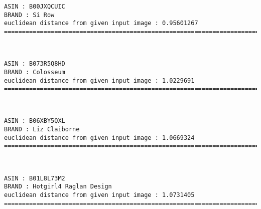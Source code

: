 \documentclass[11pt]{article}
\begin{document}
    \begin{Verbatim}[commandchars=\\\{\}]
ASIN : B00JXQCUIC
BRAND : Si Row
euclidean distance from given input image : 0.95601267
=============================================================================================================================

    \end{Verbatim}

    \begin{center}
    \end{center}
    { \hspace*{\fill} \\}
    
    \begin{Verbatim}[commandchars=\\\{\}]
ASIN : B073R5Q8HD
BRAND : Colosseum
euclidean distance from given input image : 1.0229691
=============================================================================================================================

    \end{Verbatim}

    \begin{center}
    \end{center}
    { \hspace*{\fill} \\}
    
    \begin{Verbatim}[commandchars=\\\{\}]
ASIN : B06XBY5QXL
BRAND : Liz Claiborne
euclidean distance from given input image : 1.0669324
=============================================================================================================================

    \end{Verbatim}

    \begin{center}
    \end{center}
    { \hspace*{\fill} \\}
    
    \begin{Verbatim}[commandchars=\\\{\}]
ASIN : B01L8L73M2
BRAND : Hotgirl4 Raglan Design
euclidean distance from given input image : 1.0731405
=============================================================================================================================

    \end{Verbatim}
\end{document}
